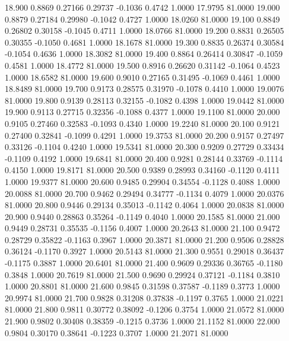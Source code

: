   18.900   0.8869   0.27166   0.29737  -0.1036   0.4742   1.0000  17.9795  81.0000
  19.000   0.8879   0.27184   0.29980  -0.1042   0.4727   1.0000  18.0260  81.0000
  19.100   0.8849   0.26802   0.30158  -0.1045   0.4711   1.0000  18.0766  81.0000
  19.200   0.8831   0.26505   0.30355  -0.1050   0.4681   1.0000  18.1678  81.0000
  19.300   0.8835   0.26374   0.30584  -0.1054   0.4636   1.0000  18.3082  81.0000
  19.400   0.8864   0.26414   0.30847  -0.1059   0.4581   1.0000  18.4772  81.0000
  19.500   0.8916   0.26620   0.31142  -0.1064   0.4523   1.0000  18.6582  81.0000
  19.600   0.9010   0.27165   0.31495  -0.1069   0.4461   1.0000  18.8489  81.0000
  19.700   0.9173   0.28575   0.31970  -0.1078   0.4410   1.0000  19.0076  81.0000
  19.800   0.9139   0.28113   0.32155  -0.1082   0.4398   1.0000  19.0442  81.0000
  19.900   0.9113   0.27715   0.32356  -0.1088   0.4377   1.0000  19.1100  81.0000
  20.000   0.9105   0.27460   0.32583  -0.1093   0.4340   1.0000  19.2240  81.0000
  20.100   0.9121   0.27400   0.32841  -0.1099   0.4291   1.0000  19.3753  81.0000
  20.200   0.9157   0.27497   0.33126  -0.1104   0.4240   1.0000  19.5341  81.0000
  20.300   0.9209   0.27729   0.33434  -0.1109   0.4192   1.0000  19.6841  81.0000
  20.400   0.9281   0.28144   0.33769  -0.1114   0.4150   1.0000  19.8171  81.0000
  20.500   0.9389   0.28993   0.34160  -0.1120   0.4111   1.0000  19.9377  81.0000
  20.600   0.9485   0.29904   0.34554  -0.1128   0.4088   1.0000  20.0088  81.0000
  20.700   0.9462   0.29494   0.34777  -0.1134   0.4079   1.0000  20.0376  81.0000
  20.800   0.9446   0.29134   0.35013  -0.1142   0.4064   1.0000  20.0838  81.0000
  20.900   0.9440   0.28863   0.35264  -0.1149   0.4040   1.0000  20.1585  81.0000
  21.000   0.9449   0.28731   0.35535  -0.1156   0.4007   1.0000  20.2643  81.0000
  21.100   0.9472   0.28729   0.35822  -0.1163   0.3967   1.0000  20.3871  81.0000
  21.200   0.9506   0.28828   0.36124  -0.1170   0.3927   1.0000  20.5143  81.0000
  21.300   0.9551   0.29018   0.36437  -0.1175   0.3887   1.0000  20.6401  81.0000
  21.400   0.9609   0.29336   0.36765  -0.1180   0.3848   1.0000  20.7619  81.0000
  21.500   0.9690   0.29924   0.37121  -0.1184   0.3810   1.0000  20.8801  81.0000
  21.600   0.9845   0.31598   0.37587  -0.1189   0.3773   1.0000  20.9974  81.0000
  21.700   0.9828   0.31208   0.37838  -0.1197   0.3765   1.0000  21.0221  81.0000
  21.800   0.9811   0.30772   0.38092  -0.1206   0.3754   1.0000  21.0572  81.0000
  21.900   0.9802   0.30408   0.38359  -0.1215   0.3736   1.0000  21.1152  81.0000
  22.000   0.9804   0.30170   0.38641  -0.1223   0.3707   1.0000  21.2071  81.0000
